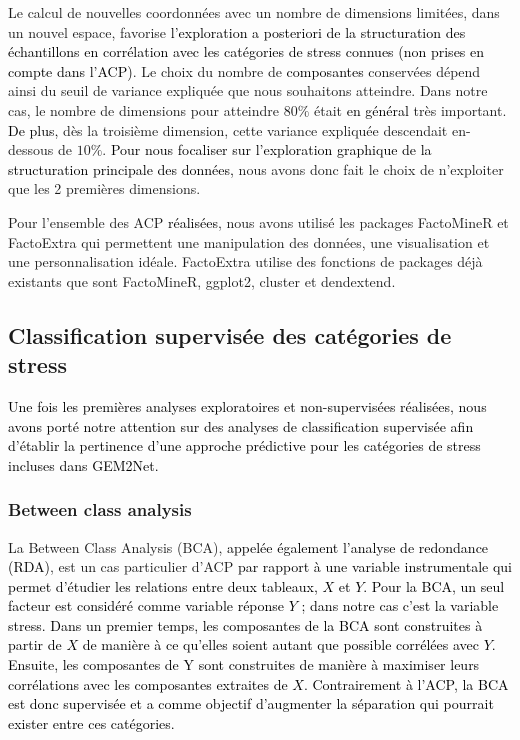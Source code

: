 \documentclass[twoside]{article}
\newcommand{\AR}[1]{\textcolor{black}{#1}}
\begin{document}
    \vspace{0.3cm}Le calcul de nouvelles coordonnées avec un nombre de dimensions limitées, dans un nouvel espace, favorise \AR{l'exploration a posteriori de la structuration des échantillons en corrélation avec les catégories de stress connues (non prises en compte dans l'ACP)}. Le choix du nombre de \AR{composantes} conservées dépend ainsi du seuil de variance expliquée que nous souhaitons atteindre. Dans notre cas, le nombre de dimensions pour atteindre $80 \%$ était \AR{en général} très important. \AR{De plus,} dès la troisième dimension, cette variance expliquée descendait en-dessous de $10 \%$. \AR{Pour nous focaliser sur l'exploration graphique de la structuration principale des données,} nous avons donc fait le choix de {n'exploiter} que les 2 premières dimensions.
    
    \vspace{0.3cm}Pour l'ensemble des ACP \AR{réalisées}, nous avons utilisé les packages FactoMineR \cite{le_factominer_2008} et FactoExtra qui permettent une manipulation des données, une visualisation et une personnalisation idéale. FactoExtra utilise des fonctions de packages déjà existants que sont FactoMineR, ggplot2, cluster et dendextend.
    
    
    \subsection{Classification supervisée des catégories de stress}
    
    \AR{Une fois les premières analyses exploratoires et non-supervisées réalisées, nous avons porté notre attention sur des analyses de classification supervisée afin d'établir la pertinence d'une approche prédictive pour les catégories de stress incluses dans GEM2Net.}
    
    \subsubsection{Between class analysis}
    
    La Between Class Analysis (BCA), \AR{appelée également l'analyse de redondance (RDA)}, est un cas particulier d'ACP \AR{par rapport à une variable instrumentale qui permet d'étudier les relations entre deux tableaux, $X$ et $Y$. Pour la BCA, un seul facteur est considéré comme variable réponse $Y$ ; dans notre cas c'est la variable stress. Dans un premier temps, les composantes de la BCA sont construites à partir de $X$ de manière à ce qu'elles soient autant que possible corrélées avec $Y$. Ensuite, les composantes de Y sont construites de manière à maximiser leurs corrélations avec les composantes extraites de $X$. Contrairement à l'ACP, la BCA est donc supervisée et a comme objectif d'augmenter la séparation qui pourrait exister entre ces catégories. }
    
\end{document}
